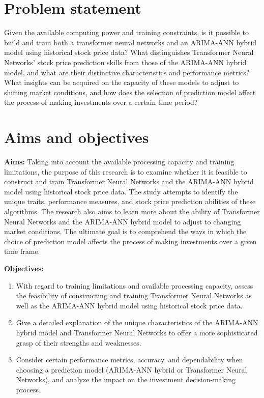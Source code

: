 \section{Problem statement}
\label{sec:intro_prob_art}
Given the available computing power and training constraints, is it possible to build and train 
both a transformer neural networks and an ARIMA-ANN hybrid model using historical stock price 
data? What distinguishes Transformer Neural Networks' stock price prediction skills from those 
of the ARIMA-ANN hybrid model, and what are their distinctive characteristics and performance 
metrics? What insights can be acquired on the capacity of these models to adjust to shifting 
market conditions, and how does the selection of prediction model affect the process of making 
investments over a certain time period?

\section{Aims and objectives}
\label{sec:intro_aims_obj}


\textbf{Aims:} 
Taking into account the available processing capacity and training limitations, the purpose of this research is to examine whether it is feasible to construct and train Transformer Neural Networks and the ARIMA-ANN hybrid model using historical stock price data. The study attempts to identify the unique traits, performance measures, and stock price prediction abilities of these algorithms. The research also aims to learn more about the ability of Transformer Neural Networks and the ARIMA-ANN hybrid model to adjust to changing market conditions. The ultimate goal is to comprehend the ways in which the choice of prediction model affects the process of making investments over a given time frame.


\textbf{Objectives:} 
    \label{sec:first objective}
    \begin{enumerate}
        \item With regard to training limitations and available processing capacity, assess the feasibility of constructing and training Transformer Neural Networks as well as the ARIMA-ANN hybrid model using historical stock price data.
        \item Give a detailed explanation of the unique characteristics of the ARIMA-ANN hybrid model and Transformer Neural Networks to offer a more sophisticated grasp of their strengths and weaknesses.
        \item Consider certain performance metrics, accuracy, and dependability when choosing a prediction model (ARIMA-ANN hybrid or Transformer Neural Networks), and analyze the impact on the investment decision-making process.
    \end{enumerate}





